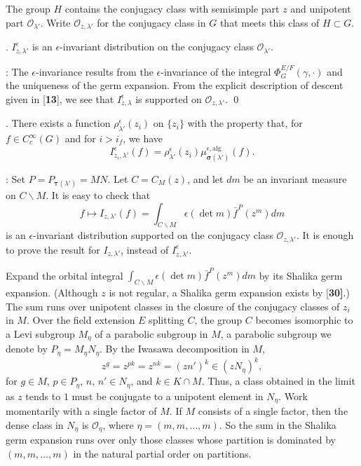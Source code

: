 \documentclass{amsart}
\begin{document}
The group $H$ contains the conjugacy class with semisimple part $z$ and
unipotent part ${\mathcal O}_{\lambda'}$.  Write ${\mathcal O}_{z,\lambda'}$ for
the conjugacy class in $G$ that meets this class of $H\subset G$.

.  $I^{\epsilon}_{z,\lambda'}$ is an
$\epsilon$-invariant distribution on the conjugacy class ${\mathcal O}_{\lambda'}$.
\finishproclaim

:  The $\epsilon$-invariance results from the
$\epsilon$-invariance of the integral $\Phi^{E/F}_G(\gamma,\cdot)$
and the uniqueness of the germ expansion.  From the explicit description
of descent given in [{\bf 13}], we see that $I^{\epsilon}_{z,\lambda}$
is supported on ${\mathcal O}_{z,\lambda'}$.
\qed\finishpproclaim

.  There exists a function $\rho^\epsilon_{\lambda'}(z_i)$
on $\{z_i\}$ with the property that,
for $f\in C_c^\infty(G)$ and for $i>i_f$, we have
$$I^{\epsilon}_{z_i,\lambda'}(f) = 
	\rho^\epsilon_{\lambda'}(z_i)\mu^{\epsilon,\text{alg}}_{\pmb
	\sigma(\lambda')}(f).$$
\finishproclaim

:   Set $P=P_{\pmb\tau(\lambda')} = MN$.  Let $C = C_M(z)$,
and let $dm$ be an invariant measure on $C\backslash M$.  It is easy to
check that
$$f\mapsto I_{z,\lambda'}(f) = \int_{C\backslash M}\epsilon(\det m )\bar f^P(z^m)dm$$
is an $\epsilon$-invariant distribution supported on the conjugacy
class ${\mathcal O}_{z,\lambda'}$. It is enough to prove the
result for $I_{z,\lambda'}$, instead of $I^{\epsilon}_{z,\lambda'}$.

Expand the orbital integral $\int_{C\backslash M}\epsilon(\det m) \bar f^P(z^m) dm$
by its Shalika germ expansion.  (Although $z$ is not regular, 
a Shalika germ expansion exists by {[\bf 30]}.)
The sum runs over unipotent classes in the closure of the conjugacy 
classes of $z_i$ in $M$.  Over the field extension $E$ splitting $C$,
the group $C$ becomes isomorphic to a Levi subgroup $M_\eta$ of a parabolic
subgroup in $M$, a parabolic subgroup we denote by $P_\eta = M_\eta N_\eta$.
By the Iwasawa decomposition in 
  $ M $,
%
$$
  z^g =
  z^{pk}=
  z^{nk} =
 (zn')^k \in 
  (z N_{\eta})^k,
 $$
  for $g \in M$, 
  $p \in P_{\eta}$, $n, \, n' \in N_{\eta}$, and
  $k \in K \cap M$.
Thus, a class obtained in the limit as $z$ tends to $1$ must be conjugate to a unipotent element in
  $ N_{\eta} $.
Work momentarily with a single factor of $M$.
If $ M$
consists of a single factor, then the dense class in $ N_{\eta} $ 
is 
  $ {\mathcal O}_{\eta} $, where $ \eta = ( m, m,\dots ,  m) $.
So the sum in the Shalika germ expansion
runs over only those classes whose partition is dominated 
  by $ (m, m, \dots , m) $
in the
  natural partial order on partitions.
\end{document}
